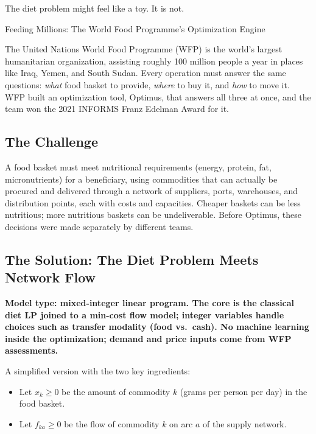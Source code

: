 The diet problem might feel like a toy.  It is not.

\begin{casestudybox}{Feeding Millions: The World Food Programme's Optimization Engine}
\label{case:wfp}

The United Nations World Food Programme (WFP) is the world's largest humanitarian organization, assisting roughly 100 million people a year in places like Iraq, Yemen, and South Sudan.  Every operation must answer the same questions: \emph{what} food basket to provide, \emph{where} to buy it, and \emph{how} to move it.  WFP built an optimization tool, Optimus, that answers all three at once, and the team won the 2021 INFORMS Franz Edelman Award for it.

\subsection*{The Challenge}
A food basket must meet nutritional requirements (energy, protein, fat, micronutrients) for a beneficiary, using commodities that can actually be procured and delivered through a network of suppliers, ports, warehouses, and distribution points, each with costs and capacities.  Cheaper baskets can be less nutritious; more nutritious baskets can be undeliverable.  Before Optimus, these decisions were made separately by different teams.

\subsection*{The Solution: The Diet Problem Meets Network Flow}
\textbf{Model type: mixed-integer linear program.  The core is the classical diet LP joined to a min-cost flow model; integer variables handle choices such as transfer modality (food vs.\ cash).  No machine learning inside the optimization; demand and price inputs come from WFP assessments.}

A simplified version with the two key ingredients:

\begin{itemize}
\item Let $x_k \geq 0$ be the amount of commodity $k$ (grams per person per day) in the food basket.
\item Let $f_{ka} \geq 0$ be the flow of commodity $k$ on arc $a$ of the supply network.
\end{itemize}


\end{casestudybox}
